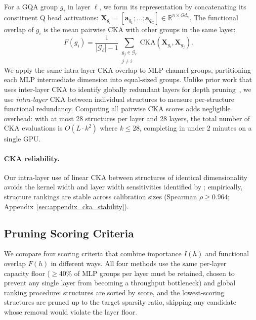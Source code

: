 For a GQA group $g_i$ in layer $\ell$, we form its representation by concatenating its constituent Q head activations: $\mathbf{X}_{g_i} = [\mathbf{a}_{q_1}; \ldots; \mathbf{a}_{q_G}] \in \mathbb{R}^{n \times Gd_h}$.
The functional overlap of $g_i$ is the mean pairwise CKA with other groups in the same layer:
\begin{equation}
    F(g_i) = \frac{1}{|\mathcal{G}_\ell| - 1} \sum_{\substack{g_j \in \mathcal{G}_\ell \\ j \neq i}} \text{CKA}(\mathbf{X}_{g_i}, \mathbf{X}_{g_j}).
    \label{eq:overlap}
\end{equation}
We apply the same intra-layer CKA overlap to MLP channel groups, partitioning each MLP intermediate dimension into equal-sized groups.
Unlike prior work that uses inter-layer CKA to identify globally redundant layers for depth pruning~\citep{mpruner2024,lachance2022cka}, we use \emph{intra-layer} CKA between individual structures to measure per-structure functional redundancy.
Computing all pairwise CKA scores adds negligible overhead: with at most 28 structures per layer and 28 layers, the total number of CKA evaluations is $O(L \cdot k^2)$ where $k \le 28$, completing in under 2 minutes on a single GPU.

\paragraph{CKA reliability.}
Our intra-layer use of linear CKA between structures of identical dimensionality avoids the kernel width and layer width sensitivities identified by \citet{davari2023cka,klabunde_similarity_survey_2023}; empirically, structure rankings are stable across calibration sizes (Spearman $\rho \geq 0.964$; Appendix~\ref{sec:appendix_cka_stability}).

\subsection{Pruning Scoring Criteria}
\label{sec:scoring}

We compare four scoring criteria that combine importance $I(h)$ and functional overlap $F(h)$ in different ways.
All four methods use the same per-layer capacity floor (${\ge}$40\% of MLP groups per layer must be retained, chosen to prevent any single layer from becoming a throughput bottleneck) and global ranking procedure: structures are sorted by score, and the lowest-scoring structures are pruned up to the target sparsity ratio, skipping any candidate whose removal would violate the layer floor.


